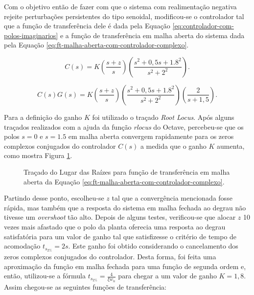 Com o objetivo então de fazer com que o sistema com realimentação negativa
rejeite perturbações persistentes do tipo senoidal, modificou-se o controlador
tal que a função de transferência dele é dada pela Equação
\ref{eq:controlador-com-polos-imaginarios} e a função de transferência em malha
aberta do sistema dada pela Equação
\ref{eq:ft-malha-aberta-com-controlador-complexo}.

\begin{equation}
    \label{eq:controlador-com-polos-imaginarios}
    C(s) = K\left(\frac{s + z}{s}\right)\left(\frac{s^2 + 0,5s + 1.8^2}{s^2 + 2^2}\right).
\end{equation}

\begin{equation}
    \label{eq:ft-malha-aberta-com-controlador-complexo}
    C(s)G(s) = K\left(\frac{s + z}{s}\right)
    \left(\frac{s^2 + 0,5s + 1.8^2}{s^2 + 2^2}\right)
    \left(\frac{2}{s+1,5}\right).
\end{equation}

Para a definição do ganho $K$ foi utilizado o traçado \textit{Root Locus}. Após
alguns traçados realizados com a ajuda da função \textit{rlocus} do Octave,
percebeu-se que os polos $s = 0$ e $s = 1.5$ em malha aberta convergem
rapidamente para os zeros complexos conjugados do controlador $C(s)$ a medida
que o ganho $K$ aumenta, como mostra Figura \ref{fig:root-locus}. 

\begin{figure}[!ht]
    \caption{Traçado do Lugar das Raízes para função de transferência em malha
    aberta da Equação \ref{eq:ft-malha-aberta-com-controlador-complexo}.}
    \vspace{-10pt}
    \hspace{-30pt}
    \label{fig:root-locus}
    \begin{minipage}{\linewidth}
        
    \end{minipage}
\end{figure}

Partindo desse ponto, escolheu-se $z$ tal que a
convergência mencionada fosse rápida, mas também que a resposta do sistema em
malha fechada ao degrau não tivesse um \textit{overshoot} tão alto. Depois de
alguns testes, verificou-se que alocar $z$ 10 vezes mais afastado que o polo da
planta oferecia uma resposta ao degrau satisfatória para um valor de ganho tal
que satisfizesse o critério de tempo de acomodação $t_{s_{2\%}} = 2s$. Este
ganho foi obtido considerando o cancelamento dos zeros complexos conjugados do
controlador. Desta forma, foi feita uma aproximação da função em malha fechada
para uma função de segunda ordem e, então, utilizou-se a fórmula $t_{s_{2\%}} =
\frac{4}{\xi w_{n}}$ para chegar a um valor de ganho $K = 1,8$. Assim chegou-se
as seguintes funções de transferência:

